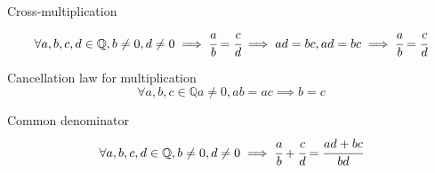 \begin{rational}
Cross-multiplication
\[
\forall a, b, c, d \in \mathbb{Q}, b \neq 0, d \neq 0 \implies \cfrac{a}{b} = \cfrac{c}{d} \implies ad = bc, ad = bc \implies \cfrac{a}{b} = \cfrac{c}{d}
\]
\end{rational}
\begin{rational}
Cancellation law for multiplication
\[
\forall a, b, c \in \mathbb{Q} a \neq 0, ab = ac \implies b = c
\]
\end{rational}
\begin{rational}
Common denominator
\[
\forall a, b, c, d \in \mathbb{Q}, b \neq 0, d \neq 0 \implies \cfrac{a}{b} + \cfrac{c}{d} = \cfrac{ad + bc}{bd}
\]
\end{rational}
